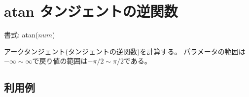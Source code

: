 
%

\section{atan タンジェントの逆関数\label{sect:atan}}

書式: atan($num$)

アークタンジェント(タンジェントの逆関数)を計算する。
パラメータの範囲は$-\infty\sim \infty$で戻り値の範囲は$-\pi/2 \sim \pi/2$である。

\subsection*{利用例}


%

